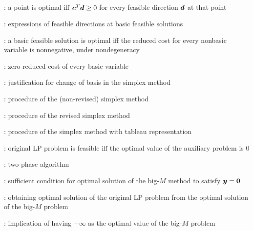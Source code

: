 \subsection*{}
\item {}: a point is optimal iff
\(\bm{c}^{T}\bm{d}\ge 0\) for every feasible direction \(\bm{d}\) at that
point
\item {}: expressions of feasible directions at basic feasible solutions
\item {}: a basic feasible solution is optimal iff the
reduced cost for every nonbasic variable is nonnegative, under nondegeneracy
\item {}: zero reduced cost of every basic variable
\item {}: justification for change of basis in the simplex method
\item {}: procedure of the (non-revised) simplex method
\item {}: procedure of the revised simplex method
\item {}: procedure of the simplex method with tableau representation
\item {}: original LP problem is feasible iff the optimal value of the auxiliary problem is \(0\)
\item {}: two-phase algorithm
\item {}: sufficient condition for optimal solution of the big-\(M\) method to satisfy \(\bm{y}=\bm{0}\)
\item {}: obtaining optimal solution of the original LP problem from the optimal solution of the big-\(M\) problem 
\item {}: implication of having \(-\infty\) as the optimal value of the big-\(M\) problem
